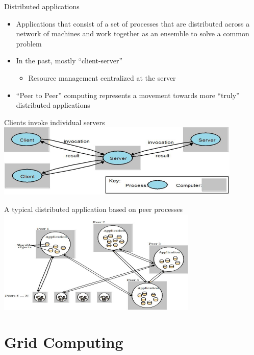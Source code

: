 \documentclass{SKP-beamer}
\begin{document}
\begin{frame}{Distributed applications}
	\begin{itemize}
		\item Applications that consist of a set of processes that are distributed across a 
		network of machines and work together as an ensemble to solve a 
		common problem
		\item In the past, mostly “client-server”
		\begin{itemize}
			\item Resource management centralized at the server
		\end{itemize}
		
		\item “Peer to Peer” computing represents a movement towards more “truly”
		distributed applications
		
		
		
	\end{itemize}
\end{frame}

\begin{frame}{Clients invoke individual servers}
	\includegraphics[scale=1.2]{3.png}
\end{frame}


\begin{frame}{A typical distributed application based on peer processes}
	\includegraphics[scale=1.4]{4.png}
\end{frame}


\section{\textbf{Grid Computing}}
\end{document}
